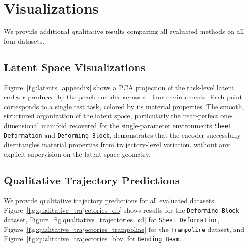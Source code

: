 \section{Visualizations} \label{app:vis}

We provide additional qualitative results comparing all evaluated methods on all four datasets.

\subsection{Latent Space Visualizations} \label{app:latent_vis}

Figure~\ref{fig:latents_appendix} shows a PCA projection of the task-level latent codes $\mathbf{r}$ produced by the \gls{peach} encoder across all four environments. Each point corresponds to a single test task, colored by its material properties. 
The smooth, structured organization of the latent space, particularly the near-perfect one-dimensional manifold recovered for the single-parameter environments \texttt{Sheet Deformation} and \texttt{Deforming Block}, demonstrates that the encoder successfully disentangles material properties from trajectory-level variation, without any explicit supervision on the latent space geometry.





\subsection{Qualitative Trajectory Predictions}

We provide qualitative trajectory predictions for all evaluated datasets.
Figure~\ref{fig:qualitative_trajectories_db} shows results for the \texttt{Deforming Block} dataset,
Figure~\ref{fig:qualitative_trajectories_sd} for \texttt{Sheet Deformation},
Figure~\ref{fig:qualitative_trajectories_trampoline} for the \texttt{Trampoline} dataset, and
Figure~\ref{fig:qualitative_trajectories_bbv} for \texttt{Bending Beam}.








